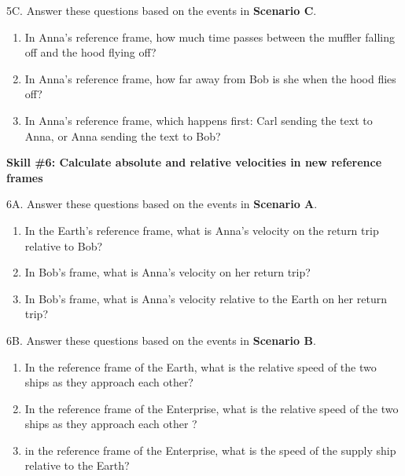 5C. Answer these questions based on the events in \textbf{Scenario C}.
\begin{enumerate}[SkillBuilderParts]
\item In Anna's reference frame, how much time passes between the muffler falling off and the hood flying off?
\answerspace{0.3in}

\item In Anna's reference frame, how far away from Bob is she when the hood flies off?
\answerspace{0.3in}

\item In Anna's reference frame, which happens first: Carl sending the text to Anna, or Anna sending the text to Bob?
\answerspace{0.3in}

\end{enumerate}

\pagebreak

\textbf{Skill \#6: Calculate absolute and relative velocities in new reference frames}

6A. Answer these questions based on the events in \textbf{Scenario A}.
\begin{enumerate}[SkillBuilderParts]
\item In the Earth's reference frame, what is Anna's velocity on the return trip relative to Bob?
\answerspace{0.6in}

\item In Bob's frame, what is Anna's velocity on her return trip?
\answerspace{0.6in}

\item In Bob's frame, what is Anna's velocity relative to the Earth on her return trip?
\answerspace{0.6in}

\end{enumerate}

6B. Answer these questions based on the events in \textbf{Scenario B}.
\begin{enumerate}[SkillBuilderParts]
\item In the reference frame of the Earth, what is the relative speed of the two ships as they approach each other?
\answerspace{0.6in}

\item In the reference frame of the Enterprise, what is the relative speed of the two ships as they approach each other ?
\answerspace{0.6in}

\item in the reference frame of the Enterprise, what is the speed of the supply ship relative to the Earth?
\answerspace{0.6in}
\end{enumerate}

